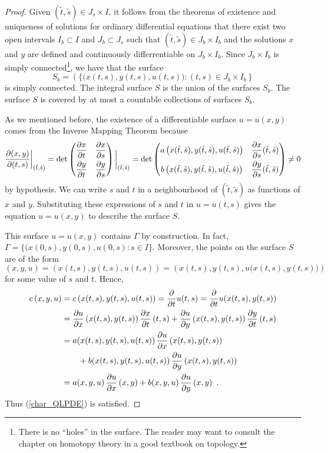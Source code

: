 \begin{proof}
 Given $(\tilde{t},\tilde{s}) \in J_s \times I$, it follows from
the theorems of existence and uniqueness of solutions for ordinary
differential equations that there exist two open intervals $I_b \subset I$
and $J_b \subset J_s$ such that $(\tilde{t},\tilde{s}) \in J_b \times I_b$
and the solutions $x$ and $y$ are defined and continuously
differrentiable on $J_b \times I_b$.  Since $J_b \times I_b$ is simply
connected\footnote{There is no ``holes'' in the surface.  The reader
may want to consult the chapter on homotopy theory in a good
textbook on topology.}, we have that the surface
\[
  S_b = \left(\{ \big( x(t,s),y(t,s),u(t,s)\big) :
    (t,s) \in J_b \times I_b \right\}
\]
is simply connected.  The integral surface $S$ is the union of the
surfaces $S_b$.  The surface $S$ is covered by at most a countable
collections of surfaces $S_b$.

 As we mentioned before, the existence of a differentiable
surface $u=u(x,y)$ comes from the Inverse Mapping Theorem because
\[
\frac{\partial(x,y)}{\partial(t,s)}\bigg|_{(\tilde{t},\tilde{s})} = \det
\begin{pmatrix}
\DS \pdydx{x}{t} & \DS \pdydx{x}{s} \\[0.7em]
\DS \pdydx{y}{t} & \DS \pdydx{y}{s}
\end{pmatrix}\bigg|_{(\tilde{t},\tilde{s})}
= \det \begin{pmatrix}
a\left(x(\tilde{t},\tilde{s}),y(\tilde{t},\tilde{s}),
 u(\tilde{t},\tilde{s})\right) &
\DS \pdydx{x}{s}(\tilde{t},\tilde{s}) \\[0.7em]
b\left(x(\tilde{t},\tilde{s}),y(\tilde{t},\tilde{s}),
 u(\tilde{t},\tilde{s})\right) &
\DS \pdydx{y}{s}(\tilde{t},\tilde{s})
\end{pmatrix} \neq 0
\]
by hypothesis.  We can write $s$ and $t$ in a neighbourhood of
$(\tilde{t},\tilde{s})$ as functions of $x$ and $y$.  Substituting
these expressions of $s$ and $t$ in $u=u(t,s)$ gives the equation
$u=u(x,y)$ to describe the surface $S$.

 This surface $u=u(x,y)$ contains $\Gamma$ by construction.
In fact,\\ $\Gamma = \{ (x(0,s),y(0,s),u(0,s) : s \in I \}$.
Moreover, the points on the surface $S$ are of the form
\[
(x,y,u) = \left(x(t,s),y(t,s), u(t,s)\right)
= \left(x(t,s),y(t,s), u\big(x(t,s),y(t,s)\big)\right)
\]
for some value of $s$ and $t$.  Hence,
\begin{align*}
c\left(x,y, u\right)
&= c\left(x(t,s),y(t,s),u(t,s)\right) = \pdfdx{u(t,s)}{t} 
= \pdfdx{u(x(t,s),y(t,s))}{t} \\
&= \pdydx{u}{x}\left(x(t,s),y(t,s)\right) \pdydx{x}{t}\left(t,s\right)
+ \pdydx{u}{y}\left(x(t,s),y(t,s)\right) \pdydx{y}{t}\left(t,s\right) \\
&= a(x(t,s),y(t,s),u(t,s)) \,\pdydx{u}{x}\left(x(t,s),y(t,s)\right) \\
& \qquad
+ b(x(t,s),y(t,s),u(t,s)) \,\pdydx{u}{y}\left(x(t,s),y(t,s)\right) \\
&= a(x,y,u) \,\pdydx{u}{x}\left(x,y\right)
+  b(x,y,u) \,\pdydx{u}{y}\left(x,y\right) \ .
\end{align*}
Thus (\ref{char_QLPDE}) is satisfied.


\end{proof}
